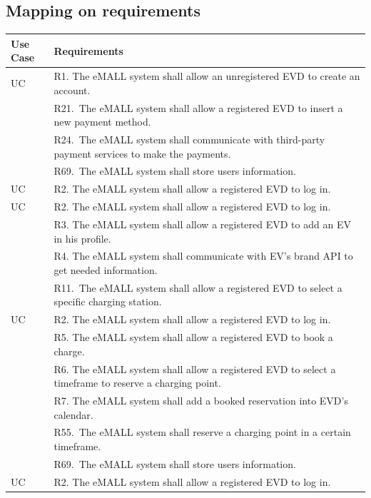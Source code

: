 \subsection{Mapping on requirements}
\label{subsec: map_on_req}%
\setcounter{mr}{1}
\newcommand{\cmr}{\themr\stepcounter{mr}}
\begin{center}
    \begin{longtable}{p{0.12\linewidth}p{0.88\linewidth}}
        \hline
        \textbf{Use Case} & \textbf{Requirements} \\
        \hline
        UC\cmr & R1. The eMALL system shall allow an unregistered EVD to create an account. \\
        & R21.\ The eMALL system shall allow a registered EVD to insert a new payment method. \\
        & R24.\ The eMALL system shall communicate with third-party payment services to make the payments. \\
        & R69.\ The eMALL system shall store users information. \\
        \hline
        UC\cmr & R2. The eMALL system shall allow a registered EVD to log in. \\
        \hline
        UC\cmr & R2. The eMALL system shall allow a registered EVD to log in. \\
        & R3. The eMALL system shall allow a registered EVD to add an EV in his profile. \\
        & R4. The eMALL system shall communicate with EV’s brand API to get needed information. \\
        & R11.\ The eMALL system shall allow a registered EVD to select a specific charging station. \\
        \hline
        UC\cmr & R2. The eMALL system shall allow a registered EVD to log in. \\
        & R5. The eMALL system shall allow a registered EVD to book a charge. \\
        & R6. The eMALL system shall allow a registered EVD to select a timeframe to reserve a charging point. \\
        & R7. The eMALL system shall add a booked reservation into EVD’s calendar. \\
        & R55.\ The eMALL system shall reserve a charging point in a certain timeframe. \\
        & R69.\ The eMALL system shall store users information. \\
        \hline
        UC\cmr & R2. The eMALL system shall allow a registered EVD to log in. \\

\end{longtable}
\end{center}
